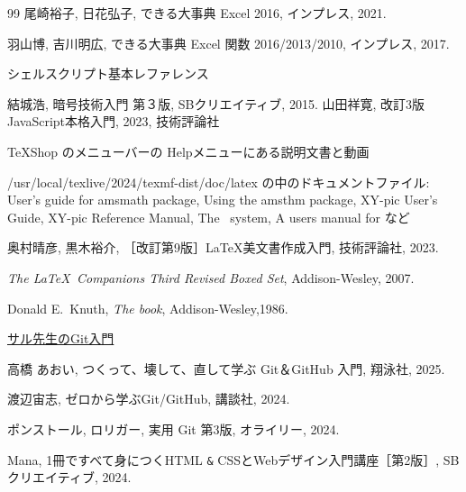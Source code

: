 \documentclass[book, paper=a4paper, 11pt]{jlreq}
\theoremstyle{definition}
\theoremstyle{remark}
\begin{document}
\begin{thebibliography}{99}
   尾崎裕子, 日花弘子, できる大事典 Excel 2016, インプレス, 2021.
   
   羽山博, 吉川明広, できる大事典 Excel 関数 2016/2013/2010, インプレス, 2017.
      
    シェルスクリプト基本レファレンス

      結城浩, 暗号技術入門 第３版, SBクリエイティブ, 2015.
      山田祥寛, 
      改訂3版JavaScript本格入門, 2023, 技術評論社

  
   TeXShop のメニューバーの Helpメニューにある説明文書と動画
   
   /usr/local/texlive/2024/texmf-dist/doc/latex の中のドキュメントファイル:  
    User's guide for amsmath package, Using the amsthm package, 
    XY-pic User's Guide, XY-pic Reference Manual,
    The \MP\, system, A users manual for \MP など
   
   奥村晴彦, 黒木裕介, 
   ［改訂第9版］\LaTeX  美文書作成入門, 技術評論社, 2023.
   
   {\em The  \LaTeX \, Companions Third Revised Boxed Set}, Addison-Wesley, 2007.
   
   Donald E.~Knuth, {\em The \MF book},  Addison-Wesley,1986.
   
     \href{https://backlog.com/ja/git-tutorial/}{サル先生のGit入門}

   高橋 あおい, つくって、壊して、直して学ぶ Git＆GitHub 入門, 翔泳社, 2025.
   
     渡辺宙志, ゼロから学ぶGit/GitHub, 講談社, 2024.

   ポンストール, ロリガー, 実用 Git 第3版, オライリー, 2024.
   
   Mana, 1冊ですべて身につくHTML \verb/&/ CSSとWebデザイン入門講座［第2版］, SBクリエイティブ, 2024.


   

\end{thebibliography}

\printindex
\end{document}
